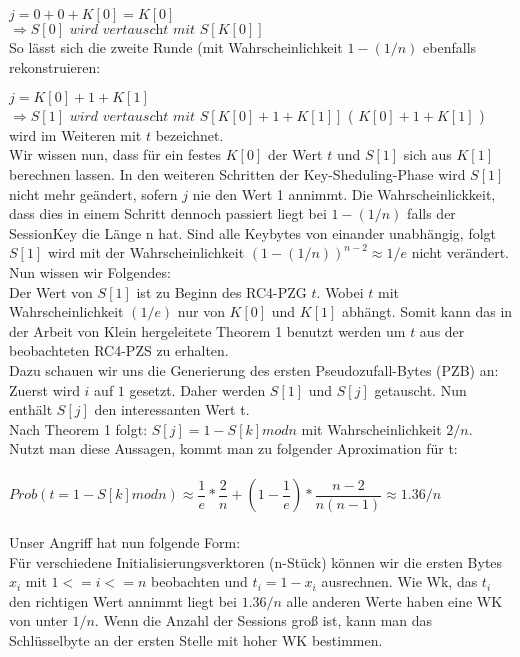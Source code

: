\documentclass[10pt,a4paper]{article}
\begin{document}
$ j = 0+0+K[0] = K[0] $\\
$\Rightarrow S[0] \textit{ wird vertauscht mit }  S[K[0]] $\\

So lässt sich die zweite Runde (mit Wahrscheinlichkeit $1 - (1/n)$ ebenfalls rekonstruieren:

$ j = K[0] + 1 + K[1]$\\  
$\Rightarrow S[1] \textit{ wird vertauscht mit } S[ K[0] + 1 + K[1] ] $ ( $K[0] + 1 + K[1]$ ) wird im Weiteren mit  $t$ bezeichnet.\\

Wir wissen nun, dass für ein festes $K[0]$ der Wert $t$ und $S[1]$ sich aus $K[1]$ berechnen lassen.
In den weiteren Schritten der Key-Sheduling-Phase wird $S[1]$ nicht mehr geändert, sofern $j$ nie den Wert 1 annimmt.
Die Wahrscheinlickkeit, dass dies in einem Schritt dennoch passiert liegt bei $1 - (1/n)$ falls der SessionKey die Länge n hat.
Sind alle Keybytes von einander unabhängig, folgt $S[1]$ wird mit der Wahrscheinlichkeit $(1-(1/n))^{n-2} \approx 1/e$ nicht verändert.\\
Nun wissen wir Folgendes:\\
Der Wert von $S[1]$ ist zu Beginn des RC4-PZG $t$. Wobei $t$ mit Wahrscheinlichkeit $(1/e)$ nur von $K[0]$ und $K[1]$ abhängt. Somit kann das in der Arbeit von Klein hergeleitete Theorem 1 \cite{Kle08} benutzt werden um $t$ aus der beobachteten RC4-PZS zu erhalten.\\
Dazu schauen wir uns die Generierung des ersten Pseudozufall-Bytes (PZB) an:\\
Zuerst wird $i$ auf $1$ gesetzt. Daher werden $S[1]$ und $S[j]$ getauscht. Nun enthält $S[j]$ den interessanten Wert t.\\
Nach Theorem 1 folgt: $S[j] = 1 - S[k] mod n$ mit Wahrscheinlichkeit $2/n$.\\
Nutzt man diese Aussagen, kommt man zu folgender Aproximation für t:\\\\
$Prob( t = 1 - S[k] mod n) \approx \dfrac{1}{e} * \dfrac{2}{n} + ( 1- \dfrac{1}{e}) * \dfrac{n-2}{n(n-1)} \approx 1.36/n$\\\\
Unser Angriff hat nun folgende Form:\\
Für verschiedene Initialisierungsverktoren (n-Stück) können wir die ersten Bytes $x_i$ mit $1 <= i <= n$ beobachten und $t_i = 1 - x_i$ ausrechnen. Wie Wk, das $t_i$ den richtigen Wert annimmt liegt bei $1.36/n$ alle anderen Werte haben eine WK von unter $1/n$. Wenn die Anzahl der Sessions groß ist, kann man das Schlüsselbyte an der ersten Stelle mit hoher WK bestimmen.\\
\end{document}
